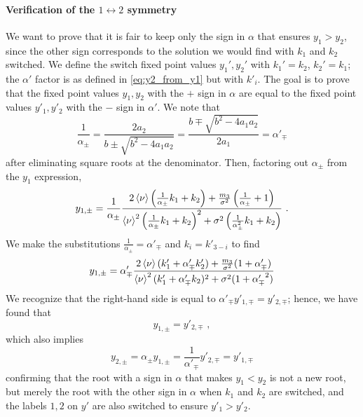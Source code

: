 \paragraph{Verification of the $1 \leftrightarrow 2$ symmetry}
We want to prove that it is fair to keep only the sign in $\alpha$ that ensures $y_1 > y_2$, since the other sign corresponds to the solution we would find with $k_1$ and $k_2$ switched. We define the switch fixed point values $y_1', y_2'$ with $k_1' = k_2$, $k_2' = k_1$; the $\alpha'$ factor is as defined in \eqref{eq:y2_from_y1} but with $k'_i$. The goal is to prove that the fixed point values $y_1, y_2$ with the $+$ sign in $\alpha$ are equal to the fixed point values $y'_1, y'_2$ with the $-$ sign in $\alpha'$.  We note that
\begin{equation*}
	\frac{1}{\alpha_{\pm}} = \frac{2 a_2}{b \pm \sqrt{b^2 - 4 a_1 a_2}} = \frac{b \mp \sqrt{b^2 - 4 a_1 a_2}}{2 a_1} = \alpha'_{\mp}
\end{equation*}
after eliminating square roots at the denominator. Then, factoring out $\alpha_{\pm}$ from the $y_1$ expression, 
\begin{equation*}
	y_{1, \pm} = \frac{1}{\alpha_{\pm}} \frac{2 \braket{\nu}\left(\frac{1}{\alpha_{\pm}} k_1 + k_2\right) + \frac{m_3}{\sigma^2}\left(\frac{1}{\alpha_{\pm}} + 1\right)} {\braket{\nu}^2 \left(\frac{1}{\alpha_{\pm}} k_1 + k_2 \right)^2 + \sigma^2 \left(\frac{1}{\alpha_{\pm}^2} k_1 + k_2 \right)} \,\, .
\end{equation*}
We make the substitutions $\frac{1}{\alpha_{\pm}} = \alpha'_{\mp}$ and $k_i = k'_{3-i}$ to find
\begin{equation*}
	y_{1, \pm} = \alpha'_{\mp} \frac{2 \braket{\nu} (k'_1 + \alpha'_{\mp}k'_2) + \frac{m_3}{\sigma^2}(1 + \alpha'_{\mp})}{\braket{\nu}^2 (k'_1 + \alpha'_{\mp} k_2)^2 + \sigma^2 (1 + {\alpha'_{\mp}}^2)}
\end{equation*}
We recognize that the right-hand side is equal to $\alpha'_{\mp} y'_{1, \mp} = y'_{2, \mp}$; hence, we have found that
\begin{equation*}
	y_{1, \pm} = y'_{2, \mp} \,\, ,
\end{equation*}
which also implies
\begin{equation*}
	y_{2, \pm} = \alpha_{\pm} y_{1, \pm} = \frac{1}{\alpha'_{\mp}} y'_{2, \mp} = y'_{1, \mp}
\end{equation*}
confirming that the root with a sign in $\alpha$ that makes $y_1 < y_2$ is not a new root, but merely the root with the other sign in $\alpha$ when $k_1$ and $k_2$ are switched, and the labels $1, 2$ on $y'$ are also switched to ensure $y'_1 > y'_2$. 

